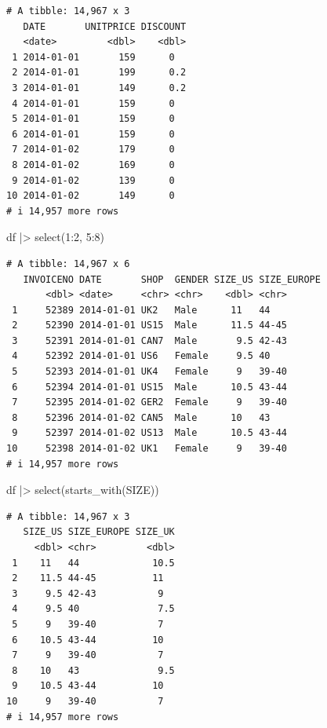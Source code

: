 \documentclass[
  letterpaper,
  DIV=11,
  numbers=noendperiod]{scrreprt}
\newenvironment{Shaded}{\begin{snugshade}}{\end{snugshade}}
\newcommand{\DecValTok}[1]{\textcolor[rgb]{0.68,0.00,0.00}{#1}}
\newcommand{\FunctionTok}[1]{\textcolor[rgb]{0.28,0.35,0.67}{#1}}
\newcommand{\NormalTok}[1]{\textcolor[rgb]{0.00,0.23,0.31}{#1}}
\newcommand{\SpecialCharTok}[1]{\textcolor[rgb]{0.37,0.37,0.37}{#1}}
\newcommand{\StringTok}[1]{\textcolor[rgb]{0.13,0.47,0.30}{#1}}
\begin{document}
\begin{verbatim}
# A tibble: 14,967 x 3
   DATE       UNITPRICE DISCOUNT
   <date>         <dbl>    <dbl>
 1 2014-01-01       159      0  
 2 2014-01-01       199      0.2
 3 2014-01-01       149      0.2
 4 2014-01-01       159      0  
 5 2014-01-01       159      0  
 6 2014-01-01       159      0  
 7 2014-01-02       179      0  
 8 2014-01-02       169      0  
 9 2014-01-02       139      0  
10 2014-01-02       149      0  
# i 14,957 more rows
\end{verbatim}

\begin{Shaded}
\begin{Highlighting}[]
\NormalTok{df }\SpecialCharTok{|\textgreater{}} \FunctionTok{select}\NormalTok{(}\DecValTok{1}\SpecialCharTok{:}\DecValTok{2}\NormalTok{, }\DecValTok{5}\SpecialCharTok{:}\DecValTok{8}\NormalTok{)  }
\end{Highlighting}
\end{Shaded}

\begin{verbatim}
# A tibble: 14,967 x 6
   INVOICENO DATE       SHOP  GENDER SIZE_US SIZE_EUROPE
       <dbl> <date>     <chr> <chr>    <dbl> <chr>      
 1     52389 2014-01-01 UK2   Male      11   44         
 2     52390 2014-01-01 US15  Male      11.5 44-45      
 3     52391 2014-01-01 CAN7  Male       9.5 42-43      
 4     52392 2014-01-01 US6   Female     9.5 40         
 5     52393 2014-01-01 UK4   Female     9   39-40      
 6     52394 2014-01-01 US15  Male      10.5 43-44      
 7     52395 2014-01-02 GER2  Female     9   39-40      
 8     52396 2014-01-02 CAN5  Male      10   43         
 9     52397 2014-01-02 US13  Male      10.5 43-44      
10     52398 2014-01-02 UK1   Female     9   39-40      
# i 14,957 more rows
\end{verbatim}

\begin{Shaded}
\begin{Highlighting}[]
\NormalTok{df }\SpecialCharTok{|\textgreater{}}
    \FunctionTok{select}\NormalTok{(}\FunctionTok{starts\_with}\NormalTok{(}\StringTok{\textquotesingle{}SIZE\textquotesingle{}}\NormalTok{))}
\end{Highlighting}
\end{Shaded}

\begin{verbatim}
# A tibble: 14,967 x 3
   SIZE_US SIZE_EUROPE SIZE_UK
     <dbl> <chr>         <dbl>
 1    11   44             10.5
 2    11.5 44-45          11  
 3     9.5 42-43           9  
 4     9.5 40              7.5
 5     9   39-40           7  
 6    10.5 43-44          10  
 7     9   39-40           7  
 8    10   43              9.5
 9    10.5 43-44          10  
10     9   39-40           7  
# i 14,957 more rows
\end{verbatim}
\end{document}
